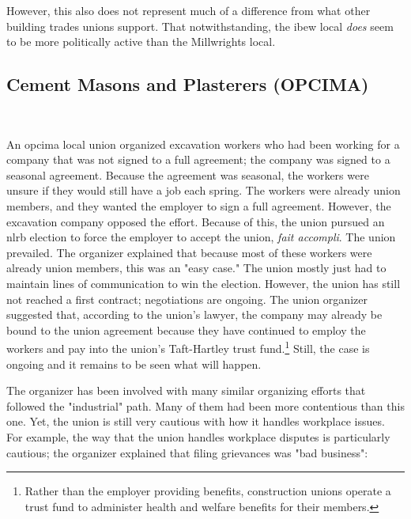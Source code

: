 \documentclass[12pt]{article}
\begin{document}
\noindent{}However, this also does not represent much of a difference from what other building trades unions support. That notwithstanding, the \acrshort{ibew} local \emph{does} seem to be more politically active than the Millwrights local.

\subsection{Cement Masons and Plasterers (OPCIMA)}\

An \acrfull{opcima} local union organized excavation workers who had been working for a company that was not signed to a full agreement; the company was signed to a seasonal agreement. Because the agreement was seasonal, the workers were unsure if they would still have a job each spring. The workers were already union members, and they wanted the employer to sign a full agreement. However, the excavation company opposed the effort. Because of this, the union pursued an \acrshort{nlrb} election to force the employer to accept the union, \textit{fait accompli}. The union prevailed. The organizer explained that because most of these workers were already union members, this was an "easy case." The union mostly just had to maintain lines of communication to win the election. However, the union has still not reached a first contract; negotiations are ongoing. The union organizer suggested that, according to the union's lawyer, the company may already be bound to the union agreement because they have continued to employ the workers and pay into the union's Taft-Hartley trust fund.\footnote{Rather than the employer providing benefits, construction unions operate a trust fund to administer health and welfare benefits for their members.} Still, the case is ongoing and it remains to be seen what will happen.

The organizer has been involved with many similar organizing efforts that followed the "industrial" path. Many of them had been more contentious than this one. Yet, the union is still very cautious with how it handles workplace issues. For example, the way that the union handles workplace disputes is particularly cautious; the organizer explained that filing grievances was "bad business":
\end{document}
